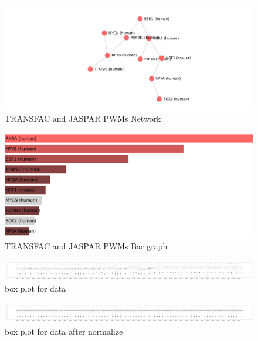 \documentclass[journal, a4paper]{IEEEtran}
\begin{document}
	
	\begin{figure}[!hbt]
		\begin{center}
		\includegraphics[width=\columnwidth]{network}
		\caption{TRANSFAC and JASPAR PWMs Network}
		\label{fig:network}
		\end{center}
	\end{figure}
	
	\begin{figure}[!hbt]
		\begin{center}
		\includegraphics[width=\columnwidth]{bar-graph.pdf}
		\caption{TRANSFAC and JASPAR PWMs Bar graph}
		\label{fig:Bar-Graph}
		\end{center}
	\end{figure}
	
	\begin{figure}[!hbt]
		\begin{center}
		\includegraphics[width=\columnwidth]{boxplot.pdf}
		\caption{box plot for data }
		\label{fig:boxplot}
		\end{center}
	\end{figure}
	
	\begin{figure}[!hbt]
		\begin{center}
		\includegraphics[width=\columnwidth]{boxplot_norm.pdf}
		\caption{box plot for data after normalize}
		\label{fig:boxplot_norm}
		\end{center}
	\end{figure}
	
\end{document}
